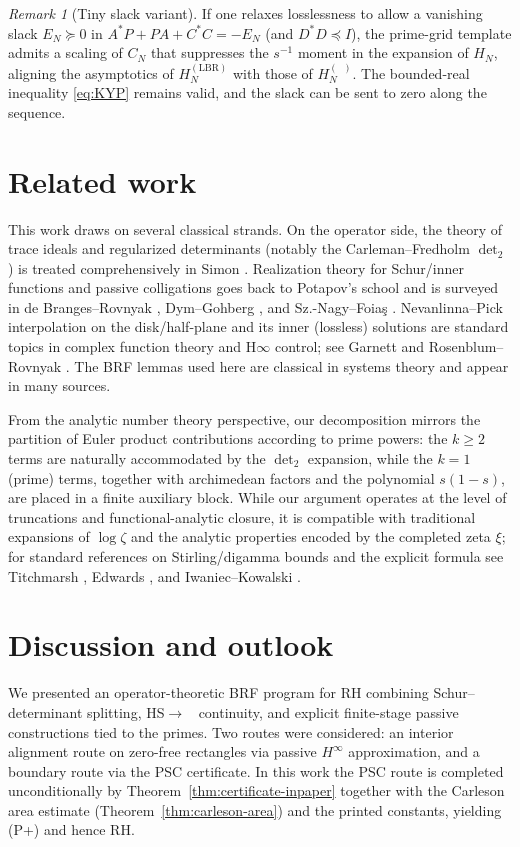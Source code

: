 \documentclass[11pt]{article}
\theoremstyle{definition}
\theoremstyle{remark}
\newtheorem{remark}[theorem]{Remark}
\DeclareMathOperator{\dettwo}{det_2}
\begin{document}
\begin{remark}[Tiny slack variant]
If one relaxes losslessness to allow a vanishing slack \(E_N\succeq 0\) in \(A^*P+PA+C^*C=-E_N\) (and \(D^*D\preceq I\)), the prime-grid template admits a scaling of \(C_N\) that suppresses the \(s^{-1}\) moment in the expansion of \(H_N\), aligning the asymptotics of \(H_N^{(\mathrm{LBR})}\) with those of \(H_N^{(\dettwo)}\). The bounded-real inequality \eqref{eq:KYP} remains valid, and the slack can be sent to zero along the sequence.
\end{remark}

\section{Related work}\label{sec:related}
This work draws on several classical strands. On the operator side, the theory of trace ideals and regularized determinants (notably the Carleman--Fredholm \(\det_2\)) is treated comprehensively in Simon \cite{SimonTraceIdeals}. Realization theory for Schur/inner functions and passive colligations goes back to Potapov's school and is surveyed in de Branges--Rovnyak \cite{deBrangesRovnyak}, Dym--Gohberg \cite{DymGohberg}, and Sz.-Nagy--Foia\c{s} \cite{SzNagyFoias}. Nevanlinna--Pick interpolation on the disk/half-plane and its inner (lossless) solutions are standard topics in complex function theory and H\(\infty\) control; see Garnett \cite{Garnett} and Rosenblum--Rovnyak \cite{RosenblumRovnyak}. The BRF lemmas used here are classical in systems theory and appear in many sources.

From the analytic number theory perspective, our decomposition mirrors the partition of Euler product contributions according to prime powers: the \(k\ge 2\) terms are naturally accommodated by the \(\det_2\) expansion, while the \(k=1\) (prime) terms, together with archimedean factors and the polynomial \(s(1-s)\), are placed in a finite auxiliary block. While our argument operates at the level of truncations and functional-analytic closure, it is compatible with traditional expansions of \(\log \zeta\) and the analytic properties encoded by the completed zeta \(\xi\); for standard references on Stirling/digamma bounds and the explicit formula see Titchmarsh \cite{TitchmarshZeta}, Edwards \cite{Edwards}, and Iwaniec--Kowalski \cite{IwaniecKowalski}.

\section{Discussion and outlook}\label{sec:discussion}
We presented an operator-theoretic BRF program for RH combining Schur--determinant splitting, HS\(\to\)\(\dettwo\) continuity, and explicit finite-stage passive constructions tied to the primes. Two routes were considered: an interior alignment route on zero-free rectangles via passive $H^\infty$ approximation, and a boundary route via the PSC certificate. In this work the PSC route is completed unconditionally by Theorem~\ref{thm:certificate-inpaper} together with the Carleson area estimate (Theorem~\ref{thm:carleson-area}) and the printed constants, yielding (P+) and hence RH.
\end{document}
